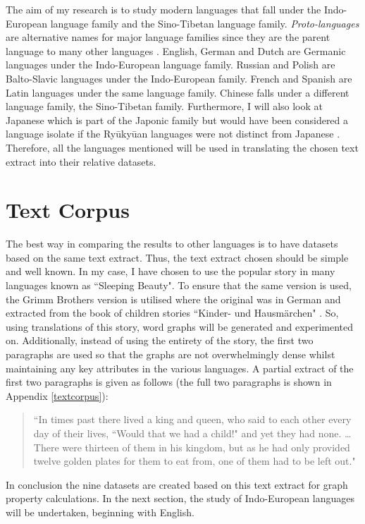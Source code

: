 The aim of my research is to study modern languages that fall under the Indo-European language family and the Sino-Tibetan language family. \emph{Proto-languages} are alternative names for major language families since they are the parent language to many other languages \cite{rowe2022concise}. English, German and Dutch are Germanic languages under the Indo-European language family. Russian and Polish are Balto-Slavic languages under the Indo-European family.  French and Spanish are Latin languages under the same language family. Chinese falls under a different language family, the Sino-Tibetan family. Furthermore, I will also look at Japanese which is part of the Japonic family but would have been considered a language isolate if the Ryūkyūan languages were not distinct from Japanese \cite{campbell2010language}. Therefore, all the languages mentioned will be used in translating the chosen text extract into their relative datasets.

\section{Text Corpus}
The best way in comparing the results to other languages is to have datasets based on the same text extract. Thus, the text extract chosen should be simple and well known. In my case, I have chosen to use the popular story in many languages known as ``Sleeping Beauty". To ensure that the same version is used, the Grimm Brothers version is utilised where the original was in German and extracted from the book of children stories ``Kinder- und Hausmärchen" \cite{grimm1857kinder}. So, using translations of this story, word graphs will be generated and experimented on.  Additionally, instead of using the entirety of the story, the first two paragraphs are used so that the graphs are not overwhelmingly dense whilst maintaining any key attributes in the various languages. A partial extract of the first two paragraphs is given as follows (the full two paragraphs is shown in Appendix \ref{textcorpus}):
\begin{quote}
``In times past there lived a king and queen, who said to each other every day of their lives, ``Would that we had a child!" and yet they had none. \dots There were thirteen of them in his kingdom, but as he had only provided twelve golden plates for them to eat from, one of them had to be left out."
\end{quote}
In conclusion the nine datasets are created based on this text extract for graph property calculations. In the next section, the study of Indo-European languages will be undertaken, beginning with English.

